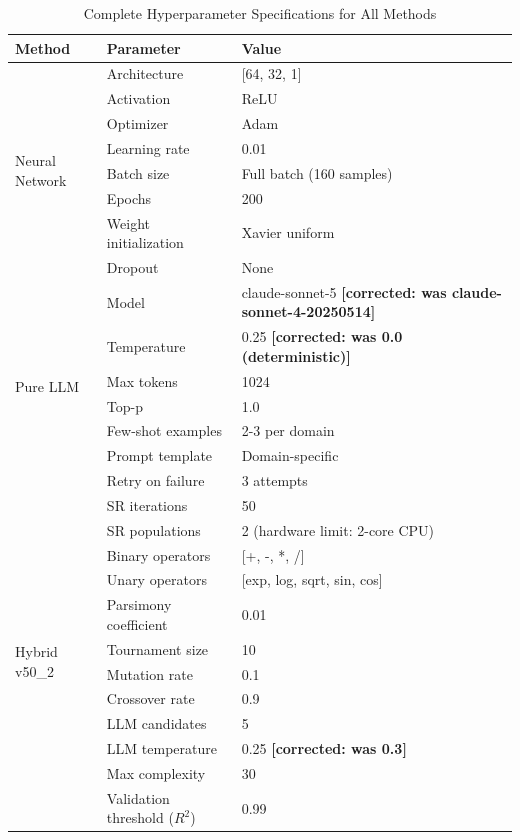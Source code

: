 \documentclass[twoside,11pt]{article}
\begin{document}
\begin{table}[H]
\centering
\caption{Complete Hyperparameter Specifications for All Methods}
\label{tab:hyperparameters_complete}
\small
\begin{tabular}{lll}
\toprule
\textbf{Method} & \textbf{Parameter} & \textbf{Value} \\
\midrule
\multirow{8}{*}{Neural Network} 
& Architecture & [64, 32, 1] \\
& Activation & ReLU \\
& Optimizer & Adam \\
& Learning rate & 0.01 \\
& Batch size & Full batch (160 samples) \\
& Epochs & 200 \\
& Weight initialization & Xavier uniform \\
& Dropout & None \\
\midrule
\multirow{7}{*}{Pure LLM}
& Model & claude-sonnet-5 \textbf{[corrected: was
  claude-sonnet-4-20250514]} \\
& Temperature & 0.25 \textbf{[corrected: was 0.0 (deterministic)]} \\
& Max tokens & 1024 \\
& Top-p & 1.0 \\
& Few-shot examples & 2-3 per domain \\
& Prompt template & Domain-specific \\
& Retry on failure & 3 attempts \\
\midrule
\multirow{12}{*}{Hybrid v50\_2}
& SR iterations & 50 \\
& SR populations & 2 (hardware limit: 2-core CPU) \\
& Binary operators & [+, -, *, /] \\
& Unary operators & [exp, log, sqrt, sin, cos] \\
& Parsimony coefficient & 0.01 \\
& Tournament size & 10 \\
& Mutation rate & 0.1 \\
& Crossover rate & 0.9 \\
& LLM candidates & 5 \\
& LLM temperature & 0.25 \textbf{[corrected: was 0.3]} \\
& Max complexity & 30 \\
& Validation threshold ($R^2$) & 0.99 \\
\bottomrule
\end{tabular}
\end{table}
\end{document}
